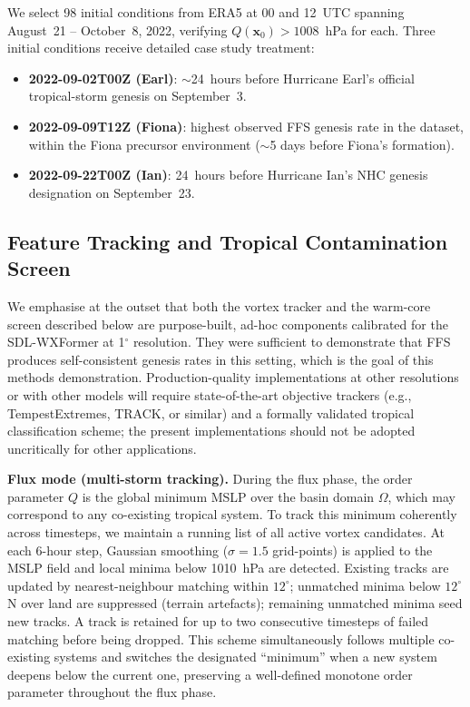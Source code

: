 \documentclass[11pt]{article}
\begin{document}
We select 98 initial conditions from ERA5 at 00 and 12~UTC spanning August~21 --
October~8, 2022, verifying $Q(\mathbf{x}_0) > 1008$~hPa for each. Three initial
conditions receive detailed case study treatment:
\begin{itemize}\setlength\itemsep{2pt}
\item \textbf{2022-09-02T00Z (Earl)}: $\sim$24~hours before Hurricane Earl's official
      tropical-storm genesis on September~3.
\item \textbf{2022-09-09T12Z (Fiona)}: highest observed FFS genesis rate in the
      dataset, within the Fiona precursor environment ($\sim$5 days before Fiona's formation).
\item \textbf{2022-09-22T00Z (Ian)}: 24~hours before Hurricane Ian's NHC
      genesis designation on September~23.
\end{itemize}

\subsection{Feature Tracking and Tropical Contamination Screen}

We emphasise at the outset that both the vortex tracker and the warm-core screen
described below are purpose-built, ad-hoc components calibrated for the SDL-WXFormer
at 1$^\circ$ resolution.
They were sufficient to demonstrate that FFS produces self-consistent genesis rates
in this setting, which is the goal of this methods demonstration.
Production-quality implementations at other resolutions or with other models
will require state-of-the-art objective trackers (e.g., TempestExtremes, TRACK,
or similar) and a formally validated tropical classification scheme;
the present implementations should not be adopted uncritically for other applications.

\textbf{Flux mode (multi-storm tracking).}
During the flux phase, the order parameter $Q$ is the global minimum MSLP over the
basin domain $\Omega$, which may correspond to any co-existing tropical system.
To track this minimum coherently across timesteps, we maintain a running list of
all active vortex candidates.  At each 6-hour step, Gaussian smoothing ($\sigma=1.5$
grid-points) is applied to the MSLP field and local minima below 1010~hPa are
detected.  Existing tracks are updated by nearest-neighbour matching within $12^\circ$;
unmatched minima below $12^\circ$N over land are suppressed (terrain artefacts);
remaining unmatched minima seed new tracks.  A track is retained for up to two
consecutive timesteps of failed matching before being dropped.  This scheme simultaneously
follows multiple co-existing systems and switches the designated ``minimum'' when a
new system deepens below the current one, preserving a well-defined monotone order
parameter throughout the flux phase.
\end{document}
